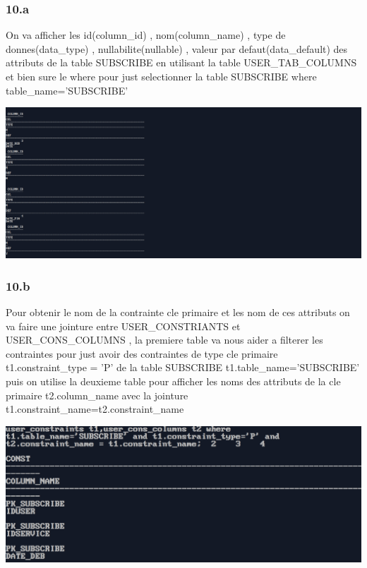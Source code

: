 \subsubsection*{10.a}
On va afficher les id(column\_id) , nom(column\_name) , type de donnes(data\_type) , nullabilite(nullable) , valeur par defaut(data\_default)
des attributs de la table SUBSCRIBE en utilisant la table USER\_TAB\_COLUMNS et bien sure le where pour just selectionner la table SUBSCRIBE
where table\_name='SUBSCRIBE'



\begin{center}
    \includegraphics[width=\textwidth]{ScreenShot/Partie5/att.png}
\end{center}

\subsubsection*{10.b}
Pour obtenir le nom de la contrainte cle primaire et les nom de ces attributs  on va faire
une jointure entre USER\_CONSTRIANTS et USER\_CONS\_COLUMNS , la premiere table va nous aider
a filterer les contraintes pour just avoir des contraintes de type cle primaire \\t1.constraint\_type = 'P' 
de la table SUBSCRIBE t1.table\_name='SUBSCRIBE' puis on utilise la deuxieme table pour afficher les noms des attributs de la cle primaire
t2.column\_name avec la jointure t1.constraint\_name=t2.constraint\_name



\begin{center}
    \includegraphics[width=\textwidth]{ScreenShot/Partie5/pk.png}
\end{center}

